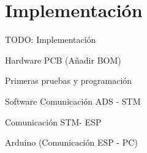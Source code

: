 \chapter{Implementación\label{sec:Implementacion}}

TODO: Implementación

Hardware
	PCB (Añadir BOM)
	
	Primeras pruebas y programación
	

Software
	Comunicación ADS - STM
	
	Comunicación STM- ESP
	
	Arduino (Comunicación ESP - PC)
	
	